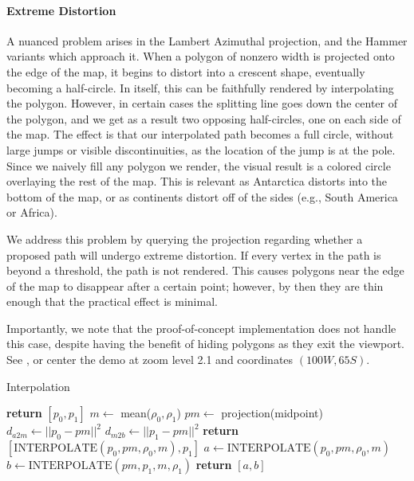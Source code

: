 \paragraph{Extreme Distortion}
A nuanced problem arises in the Lambert Azimuthal projection, and the Hammer
  variants which approach it.
When a polygon of nonzero width is projected onto the edge of the map, it
  begins to distort into a crescent shape, eventually becoming a half-circle.
In itself, this can be faithfully rendered by interpolating the polygon.
However, in certain cases the splitting line goes down the center of the
  polygon, and we get as a result two opposing half-circles, one on each side
  of the map.
The effect is that our interpolated path becomes a full circle, without large
  jumps or visible discontinuities, as the location of the jump is at the pole.
Since we naively fill any polygon we render, the visual result is a colored
  circle overlaying the rest of the map.
This is relevant as Antarctica distorts into the bottom of the map, or as
  continents distort off of the sides (e.g., South America or Africa).

We address this problem by querying the projection regarding whether a
  proposed path will undergo extreme distortion.
If every vertex in the path is beyond a threshold, the path is not rendered.
This causes polygons near the edge of the map to disappear after a certain
  point; however, by then they are thin enough that the practical effect is
  minimal.

Importantly, we note that the proof-of-concept implementation does not handle
  this case, despite having the benefit of hiding polygons as they exit the
  viewport.
See , or center the demo at zoom level 2.1 and coordinates
  $(100W, 65S)$.


\begin{algorithm}
  \caption{Interpolation}\label{euclid}
  \begin{algorithmic}[1]
        \State \textbf{return} $[p_0, p_1]$
      \EndIf
      \State $m \gets$ mean($\rho_0, \rho_1$)
      \State $pm \gets$ projection(midpoint)
      \State $d_{a2m} \gets ||p_0 - pm||^2$
      \State $d_{m2b} \gets ||p_1 - pm||^2$
        \State \textbf{return} $[\text{INTERPOLATE}(p_0, pm, \rho_0, m), p_1]$
      \Else
        \State $a \gets \text{INTERPOLATE}(p_0, pm, \rho_0, m)$
        \State $b \gets \text{INTERPOLATE}(pm, p_1, m, \rho_1)$
        \State \textbf{return} $[a, b]$
      \EndIf
    \EndProcedure
  \end{algorithmic}
\end{algorithm}
